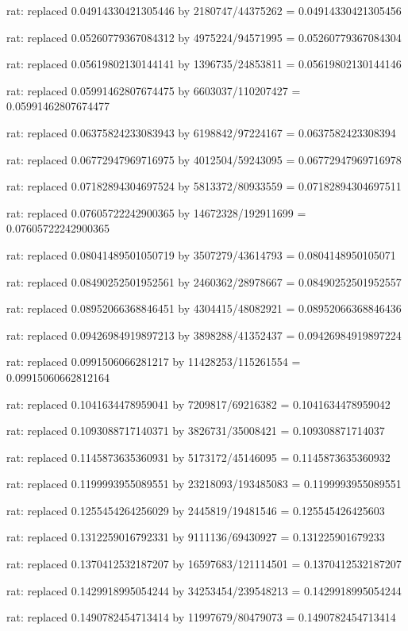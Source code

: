 \documentclass[a4paper,10pt]{article}
\begin{document}
\begin{eulernotebook}
\begin{eulercomment}
\begin{eulercomment}
\begin{eulercomment}
\begin{eulercomment}
\begin{eulercomment}
\begin{eulercomment}
\begin{eulercomment}
\begin{eulercomment}
\begin{eulercomment}
\begin{eulercomment}
\begin{eulercomment}
\begin{eulercomment}
\begin{eulercomment}
\begin{eulercomment}
\begin{eulercomment}
\begin{eulercomment}
\begin{euleroutput}
  rat: replaced 0.04914330421305446 by 2180747/44375262 = 0.04914330421305456
  
  rat: replaced 0.05260779367084312 by 4975224/94571995 = 0.05260779367084304
  
  rat: replaced 0.05619802130144141 by 1396735/24853811 = 0.05619802130144146
  
  rat: replaced 0.05991462807674475 by 6603037/110207427 = 0.05991462807674477
  
  rat: replaced 0.06375824233083943 by 6198842/97224167 = 0.0637582423308394
  
  rat: replaced 0.06772947969716975 by 4012504/59243095 = 0.06772947969716978
  
  rat: replaced 0.07182894304697524 by 5813372/80933559 = 0.07182894304697511
  
  rat: replaced 0.07605722242900365 by 14672328/192911699 = 0.07605722242900365
  
  rat: replaced 0.08041489501050719 by 3507279/43614793 = 0.0804148950105071
  
  rat: replaced 0.08490252501952561 by 2460362/28978667 = 0.08490252501952557
  
  rat: replaced 0.08952066368846451 by 4304415/48082921 = 0.08952066368846436
  
  rat: replaced 0.09426984919897213 by 3898288/41352437 = 0.09426984919897224
  
  rat: replaced 0.0991506066281217 by 11428253/115261554 = 0.09915060662812164
  
  rat: replaced 0.1041634478959041 by 7209817/69216382 = 0.1041634478959042
  
  rat: replaced 0.1093088717140371 by 3826731/35008421 = 0.109308871714037
  
  rat: replaced 0.1145873635360931 by 5173172/45146095 = 0.1145873635360932
  
  rat: replaced 0.1199993955089551 by 23218093/193485083 = 0.1199993955089551
  
  rat: replaced 0.1255454264256029 by 2445819/19481546 = 0.125545426425603
  
  rat: replaced 0.1312259016792331 by 9111136/69430927 = 0.131225901679233
  
  rat: replaced 0.1370412532187207 by 16597683/121114501 = 0.1370412532187207
  
  rat: replaced 0.1429918995054244 by 34253454/239548213 = 0.1429918995054244
  
  rat: replaced 0.1490782454713414 by 11997679/80479073 = 0.1490782454713414
  

\end{euleroutput}
\end{eulercomment}
\end{eulercomment}
\end{eulercomment}
\end{eulercomment}
\end{eulercomment}
\end{eulercomment}
\end{eulercomment}
\end{eulercomment}
\end{eulercomment}
\end{eulercomment}
\end{eulercomment}
\end{eulercomment}
\end{eulercomment}
\end{eulercomment}
\end{eulercomment}
\end{eulercomment}
\end{eulernotebook}
\end{document}
